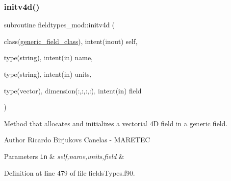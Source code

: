 \subsubsection{\texorpdfstring{initv4d()}{initv4d()}}
{\footnotesize\ttfamily subroutine fieldtypes\+\_\+mod\+::initv4d (\begin{DoxyParamCaption}\item[{class(\mbox{\hyperlink{structfieldtypes__mod_1_1generic__field__class}{generic\+\_\+field\+\_\+class}}), intent(inout)}]{self,  }\item[{type(string), intent(in)}]{name,  }\item[{type(string), intent(in)}]{units,  }\item[{type(vector), dimension(\+:,\+:,\+:,\+:), intent(in)}]{field }\end{DoxyParamCaption})\hspace{0.3cm}{\ttfamily [private]}}



Method that allocates and initializes a vectorial 4D field in a generic field. 

\begin{DoxyAuthor}{Author}
Ricardo Birjukovs Canelas -\/ M\+A\+R\+E\+T\+EC 
\end{DoxyAuthor}

\begin{DoxyParams}[1]{Parameters}
\mbox{\tt in}  & {\em self,name,units,field} & \\
\hline
\end{DoxyParams}


Definition at line 479 of file fields\+Types.\+f90.


